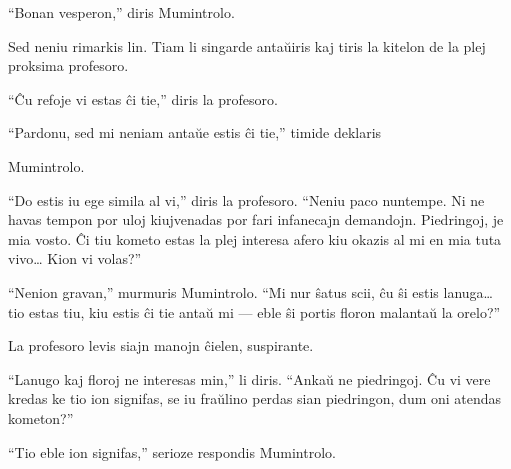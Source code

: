 ``Bonan vesperon,'' diris Mumintrolo.

Sed neniu rimarkis lin. Tiam li singarde antaŭiris kaj tiris la kitelon de la plej proksima profesoro.

``Ĉu refoje vi estas ĉi tie,'' diris la profesoro.

``Pardonu, sed mi neniam antaŭe estis ĉi tie,'' timide deklaris

Mumintrolo.

``Do estis iu ege simila al vi,'' diris la profesoro. ``Neniu paco nuntempe. Ni ne havas tempon por uloj kiujvenadas por fari infanecajn demandojn. Piedringoj, je mia vosto. Ĉi tiu kometo estas la plej interesa afero kiu okazis al mi en mia tuta vivo{\ldots} Kion vi volas?''

``Nenion gravan,'' murmuris Mumintrolo. ``Mi nur ŝatus scii, ĉu ŝi estis lanuga{\ldots} tio estas tiu, kiu estis ĉi tie antaŭ mi --- eble ŝi portis floron malantaŭ la orelo?''

La profesoro levis siajn manojn ĉielen, suspirante.

``Lanugo kaj floroj ne interesas min,'' li diris. ``Ankaŭ ne piedringoj. Ĉu vi vere kredas ke tio ion signifas, se iu fraŭlino perdas sian piedringon, dum oni atendas kometon?''

``Tio eble ion signifas,'' serioze respondis Mumintrolo.


